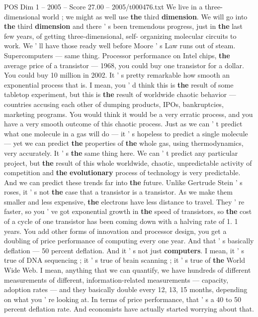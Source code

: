 \begin{textsample}{POS Dim 1 – 2005 – Score 27.00 – 2005/t000476.txt}
We live in a three-dimensional world ; we might as well use \textbf{the} third \textbf{dimension}.
We will go into \textbf{the} third \textbf{dimension} and there ' s been tremendous progress, just in \textbf{the} last few years, of getting three-dimensional, self- organizing molecular circuits to work.
We ' ll have those ready well before Moore ' s Law runs out of steam.
Supercomputers — same thing.
Processor performance on Intel chips, \textbf{the} average price of a transistor — 1968, you could buy one transistor for a dollar.
You could buy 10 million in 2002.
It ' s pretty remarkable how smooth an exponential process that is.
I mean, you ' d think this is \textbf{the} result of some tabletop experiment, but this is \textbf{the} result of worldwide chaotic behavior — countries accusing each other of dumping products, IPOs, bankruptcies, marketing programs.
You would think it would be a very erratic process, and you have a very smooth outcome of this chaotic process.
Just as we can ' t predict what one molecule in a gas will do — it ' s hopeless to predict a single molecule — yet we can predict \textbf{the} properties of \textbf{the} whole gas, using thermodynamics, very accurately.
It ' s \textbf{the} same thing here.
We can ' t predict any particular project, but \textbf{the} result of this whole worldwide, chaotic, unpredictable activity of competition and \textbf{the} \textbf{evolutionary} process of technology is very predictable.
And we can predict these trends far into \textbf{the} future.
Unlike Gertrude Stein ' s roses, it ' s not \textbf{the} case that a transistor is a transistor.
As we make them smaller and less expensive, \textbf{the} electrons have less distance to travel.
They ' re faster, so you ' ve got exponential growth in \textbf{the} speed of transistors, so \textbf{the} cost of a cycle of one transistor has been coming down with a halving rate of 1. 1 years.
You add other forms of innovation and processor design, you get a doubling of price performance of computing every one year.
And that ' s basically deflation — 50 percent deflation.
And it ' s not just \textbf{computers}.
I mean, it ' s true of DNA sequencing ; it ' s true of brain scanning ; it ' s true of \textbf{the} World Wide Web.
I mean, anything that we can quantify, we have hundreds of different measurements of different, information-related measurements — capacity, adoption rates — and they basically double every 12, 13, 15 months, depending on what you ' re looking at.
In terms of price performance, that ' s a 40 to 50 percent deflation rate.
And economists have actually started worrying about that.

\end{textsample}
